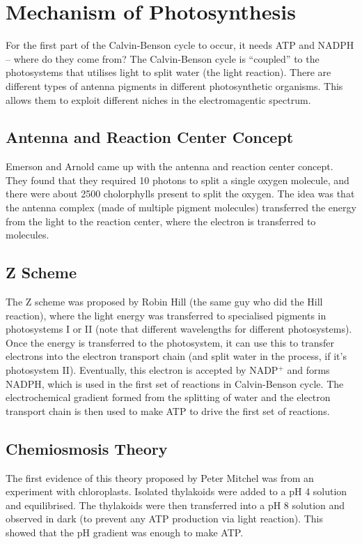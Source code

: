 \section{Mechanism of Photosynthesis}

For the first part of the Calvin-Benson cycle to occur, it needs ATP and NADPH -- where do they come from?
The Calvin-Benson cycle is ``coupled'' to the photosystems that utilises light to split water (the light reaction).
There are different types of antenna pigments in different photosynthetic organisms.
This allows them to exploit different niches in the electromagentic spectrum.

\subsection{Antenna and Reaction Center Concept}

Emerson and Arnold came up with the antenna and reaction center concept.
They found that they required 10 photons to split a single oxygen molecule, and there were about 2500 cholorphylls present to split the oxygen.
The idea was that the antenna complex (made of multiple pigment molecules) transferred the energy from the light to the reaction center, where the electron is transferred to molecules.

\subsection{Z Scheme}

\begin{center}
\end{center}

The Z scheme was proposed by Robin Hill (the same guy who did the Hill reaction), where the light energy was transferred to specialised pigments in photosystems I or II (note that different wavelengths for different photosystems).
Once the energy is transferred to the photosystem, it can use this to transfer electrons into the electron transport chain (and split water in the process, if it's photosystem II).
Eventually, this electron is accepted by NADP$^+$ and forms NADPH, which is used in the first set of reactions in Calvin-Benson cycle.
The electrochemical gradient formed from the splitting of water and the electron transport chain is then used to make ATP to drive the first set of reactions.

\subsection{Chemiosmosis Theory}

The first evidence of this theory proposed by Peter Mitchel was from an experiment with chloroplasts.
Isolated thylakoids were added to a pH 4 solution and equilibrised.
The thylakoids were then transferred into a pH 8 solution and observed in dark (to prevent any ATP production via light reaction).
This showed that the pH gradient was enough to make ATP.

